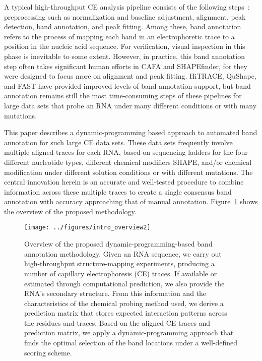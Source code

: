 A typical high-throughput CE analysis pipeline consists of the following steps~\citep{Yoon2011,Karabiber2013,Kladwang2014}: preprocessing such as normalization and baseline adjustment, alignment, peak detection, band annotation, and peak fitting. Among these, band annotation refers to the process of mapping each band in an electrophoretic trace to a position in the nucleic acid sequence. For verification, visual inspection in this phase is inevitable to some extent. However, in practice, this band annotation step often takes significant human efforts in CAFA and SHAPEfinder, for they were designed to focus more on alignment and peak fitting. HiTRACE, QuShape, and FAST have provided improved levels of band annotation support, but band annotation remains still the most time-consuming steps of these pipelines for large data sets that probe an RNA under many different conditions or with many mutations.

This paper describes a dynamic-programming based approach to automated band annotation for such large CE data sets. These data sets frequently involve multiple aligned traces for each RNA, based on sequencing ladders for the four different nucleotide types, different chemical modifiers SHAPE, and/or chemical modification under different solution conditions or with different mutations. The central innovation herein is an accurate and well-tested procedure to combine information across these multiple traces to create a single consensus band annotation with accuracy approaching that of manual annotation. Figure~\ref{f:overview} shows the overview of the proposed methodology.


\begin{figure}
\centering
\texttt{[image: ../figures/intro\_overview2]}
\caption{Overview of the proposed dynamic-programming-based band annotation methodology. Given an RNA sequence, we carry out high-throughput structure-mapping experiments, producing a number of capillary electrophoresis (CE) traces. If available or estimated through computational prediction, we also provide the RNA's secondary structure. From this information and the characteristics of the chemical probing method used, we derive a prediction matrix that stores expected interaction patterns across the residues and traces. Based on the aligned CE traces and prediction matrix, we apply a dynamic-programming approach that finds the optimal selection of the band locations under a well-defined scoring scheme.}
\label{f:overview}
\end{figure}


